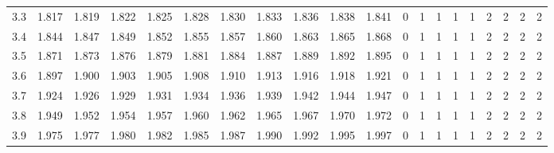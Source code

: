 \begin{table}[H]
{\begin{tabular}{|c|c|c|c|c|c|c|c|c|c|c|c|c|c|c|c|c|c|c|c|}
        3.3 & 1.817 & 1.819 & 1.822 & 1.825 & 1.828 & 1.830 & 1.833 & 1.836 & 1.838 & 1.841 & 0 & 1 & 1 & 1 & 1 & 2 & 2 & 2 & 2 \\
        3.4 & 1.844 & 1.847 & 1.849 & 1.852 & 1.855 & 1.857 & 1.860 & 1.863 & 1.865 & 1.868 & 0 & 1 & 1 & 1 & 1 & 2 & 2 & 2 & 2 \\
        3.5 & 1.871 & 1.873 & 1.876 & 1.879 & 1.881 & 1.884 & 1.887 & 1.889 & 1.892 & 1.895 & 0 & 1 & 1 & 1 & 1 & 2 & 2 & 2 & 2 \\
        3.6 & 1.897 & 1.900 & 1.903 & 1.905 & 1.908 & 1.910 & 1.913 & 1.916 & 1.918 & 1.921 & 0 & 1 & 1 & 1 & 1 & 2 & 2 & 2 & 2 \\
        3.7 & 1.924 & 1.926 & 1.929 & 1.931 & 1.934 & 1.936 & 1.939 & 1.942 & 1.944 & 1.947 & 0 & 1 & 1 & 1 & 1 & 2 & 2 & 2 & 2 \\
        3.8 & 1.949 & 1.952 & 1.954 & 1.957 & 1.960 & 1.962 & 1.965 & 1.967 & 1.970 & 1.972 & 0 & 1 & 1 & 1 & 1 & 2 & 2 & 2 & 2 \\
        3.9 & 1.975 & 1.977 & 1.980 & 1.982 & 1.985 & 1.987 & 1.990 & 1.992 & 1.995 & 1.997 & 0 & 1 & 1 & 1 & 1 & 2 & 2 & 2 & 2 \\
        \hline
    \end{tabular}%
    }
\end{table}
